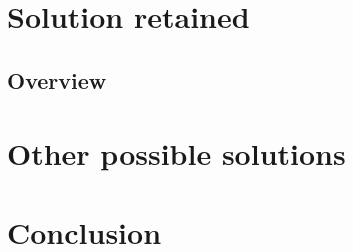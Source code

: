 


\pagebreak      %
\section{Solution retained}
\label{sec:solution}
\subsection{Overview}


\pagebreak      %
\section{Other possible solutions}
\label{sec:other-solutions}


\pagebreak      %
\section{Conclusion}
\label{sec:conclusion}



\pagebreak      %


\pagebreak
\appendix



